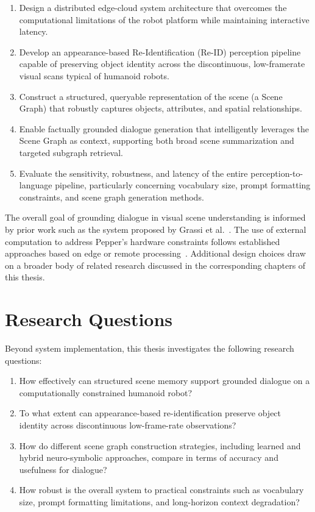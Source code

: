 \begin{enumerate}
    \item Design a distributed edge-cloud system architecture that overcomes the computational limitations of the robot platform while maintaining interactive latency.
    \item Develop an appearance-based Re-Identification (Re-ID) perception pipeline capable of preserving object identity across the discontinuous, low-framerate visual scans typical of humanoid robots.
    \item Construct a structured, queryable representation of the scene (a Scene Graph) that robustly captures objects, attributes, and spatial relationships.
    \item Enable factually grounded dialogue generation that intelligently leverages the Scene Graph as context, supporting both broad scene summarization and targeted subgraph retrieval.
    \item Evaluate the sensitivity, robustness, and latency of the entire perception-to-language pipeline, particularly concerning vocabulary size, prompt formatting constraints, and scene graph generation methods.
\end{enumerate}

The overall goal of grounding dialogue in visual scene understanding is informed by prior work such as the system proposed by Grassi et al.~\cite{grassi_grounding_2024}. The use of external computation to address Pepper's hardware constraints follows established approaches based on edge or remote processing~\cite{reyes_near_2018,trinquet_future_2025,brad_retrieval-augmented_2025}. Additional design choices draw on a broader body of related research discussed in the corresponding chapters of this thesis.

\section{Research Questions}

Beyond system implementation, this thesis investigates the following research questions:

\begin{enumerate}
    \item How effectively can structured scene memory support grounded dialogue on a computationally constrained humanoid robot?

    \item To what extent can appearance-based re-identification preserve object identity across discontinuous low-frame-rate observations?

    \item How do different scene graph construction strategies, including learned and hybrid neuro-symbolic approaches, compare in terms of accuracy and usefulness for dialogue?

    \item How robust is the overall system to practical constraints such as vocabulary size, prompt formatting limitations, and long-horizon context degradation?
\end{enumerate}

